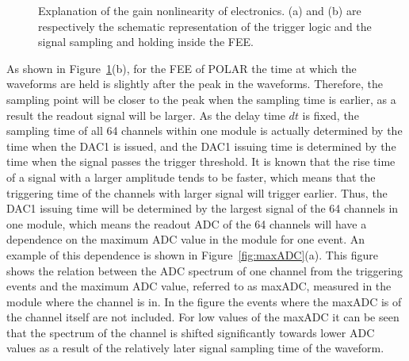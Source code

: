 \documentclass[preprint,sort&compress,12pt]{elsarticle}
\begin{document}
\begin{figure}[!ht]
\centering
{}
\hspace{2mm}
\caption{Explanation of the gain nonlinearity of electronics. (a) and (b) are respectively the schematic representation of the trigger logic and the signal sampling and holding inside the FEE.}\label{fig:trigger_logic}
\end{figure}

As shown in Figure~\ref{fig:trigger_logic}(b), for the FEE of POLAR the time at which the waveforms are held is slightly after the peak in the waveforms. Therefore, the sampling point will be closer to the peak when the sampling time is earlier, as a result the readout signal will be larger. As the delay time $dt$ is fixed, the sampling time of all 64 channels within one module is actually determined by the time when the DAC1 is issued, and the DAC1 issuing time is determined by the time when the signal passes the trigger threshold. It is known that the rise time of a signal with a larger amplitude tends to be faster, which means that the triggering time of the channels with larger signal will trigger earlier. Thus, the DAC1 issuing time will be determined by the largest signal of the 64 channels in one module, which means the readout ADC of the 64 channels will have a dependence on the maximum ADC value in the module for one event. An example of this dependence is shown in Figure~\ref{fig:maxADC}(a). This figure shows the relation between the ADC spectrum of one channel from the triggering events and the maximum ADC value, referred to as maxADC, measured in the module where the channel is in. In the figure the events where the maxADC is of the channel itself are not included. For low values of the maxADC it can be seen that the spectrum of the channel is shifted significantly towards lower ADC values as a result of the relatively later signal sampling time of the waveform.
\end{document}
